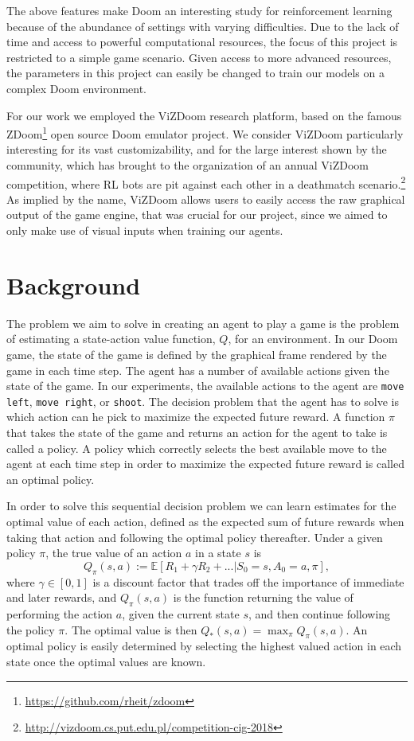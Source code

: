 \documentclass[letterpaper]{article} %
\begin{document}
The above features make Doom an interesting study for reinforcement learning because of the abundance of settings with varying difficulties. Due to the lack of time and access to powerful computational resources, the focus of this project is restricted to a simple game scenario. Given access to more advanced resources, the parameters in this project can easily be changed to train our models on a complex Doom environment.

For our work we employed the ViZDoom \cite{vizdoom} research platform, based on the famous ZDoom\footnote{\url{https://github.com/rheit/zdoom}} open source Doom emulator project. We consider ViZDoom particularly interesting for its vast customizability, and for the large interest shown by the community, which has brought to the organization of an annual ViZDoom competition, where RL bots are pit against each other in a deathmatch scenario.\footnote{\url{http://vizdoom.cs.put.edu.pl/competition-cig-2018}} As implied by the name, ViZDoom allows users to easily access the raw graphical output of the game engine, that was crucial for our project, since we aimed to only make use of visual inputs when training our agents.



\section{Background}
The problem we aim to solve in creating an agent to play a game is the problem of estimating a state-action value function, $Q$, for an environment. In our Doom game, the state of the game is defined by the graphical frame rendered by the game in each time step. The agent has a number of available actions given the state of the game. In our experiments, the available actions to the agent are \texttt{move left}, \texttt{move right}, or \texttt{shoot}. The decision problem that the agent has to solve is which action can he pick to maximize the expected future reward. A function $\pi$ that takes the state of the game and returns an action for the agent to take is called a policy. A policy which correctly selects the best available move to the agent at each time step in order to maximize the expected future reward is called an optimal policy. 

In order to solve this sequential decision problem we can learn estimates for the optimal value of each action, defined as the expected sum of future rewards when taking that action and following the optimal policy thereafter. Under a given policy $\pi$, the true value of an action $a$ in a state $s$ is
$$ Q_{\pi}(s,a) := \mathbb{E}[R_1+\gamma R_2 + ... | S_0 = s, A_0 = a, \pi ], $$ 
where $\gamma \in [0, 1]$ is a discount factor that trades off the importance of immediate and later rewards, and $Q_{\pi}(s,a)$ is the function returning the value of performing the action $a$, given the current state $s$, and then continue following the policy $\pi$. The optimal value is then $Q_*(s,a) = \max_{\pi} Q_{\pi}(s,a)$. An optimal policy is easily determined by selecting the highest valued action in each state once the optimal values are known. 
\end{document}
